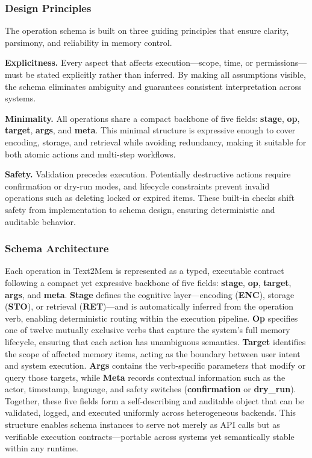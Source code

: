 \documentclass[conference]{IEEEtran}
\begin{document}
\subsubsection{\textbf{Design Principles}}

The operation schema is built on three guiding principles that ensure clarity, parsimony, and reliability in memory control.

\textbf{Explicitness.}
Every aspect that affects execution—scope, time, or permissions—must be stated explicitly rather than inferred.  
By making all assumptions visible, the schema eliminates ambiguity and guarantees consistent interpretation across systems.

\textbf{Minimality.}
All operations share a compact backbone of five fields: \textbf{stage}, \textbf{op}, \textbf{target}, \textbf{args}, and \textbf{meta}.  
This minimal structure is expressive enough to cover encoding, storage, and retrieval while avoiding redundancy, making it suitable for both atomic actions and multi-step workflows.

\textbf{Safety.}
Validation precedes execution.  
Potentially destructive actions require confirmation or dry-run modes, and lifecycle constraints prevent invalid operations such as deleting locked or expired items.  
These built-in checks shift safety from implementation to schema design, ensuring deterministic and auditable behavior.

\subsubsection{\textbf{Schema Architecture}}

Each operation in Text2Mem is represented as a typed, executable contract following a compact yet expressive backbone of five fields: \textbf{stage}, \textbf{op}, \textbf{target}, \textbf{args}, and \textbf{meta}.  
\textbf{Stage} defines the cognitive layer—encoding (\textbf{ENC}), storage (\textbf{STO}), or retrieval (\textbf{RET})—and is automatically inferred from the operation verb, enabling deterministic routing within the execution pipeline.  
\textbf{Op} specifies one of twelve mutually exclusive verbs that capture the system’s full memory lifecycle, ensuring that each action has unambiguous semantics.  
\textbf{Target} identifies the scope of affected memory items, acting as the boundary between user intent and system execution.  
\textbf{Args} contains the verb-specific parameters that modify or query those targets, while \textbf{Meta} records contextual information such as the actor, timestamp, language, and safety switches (\textbf{confirmation} or \textbf{dry\_run}).  
Together, these five fields form a self-describing and auditable object that can be validated, logged, and executed uniformly across heterogeneous backends.  
This structure enables schema instances to serve not merely as API calls but as verifiable execution contracts—portable across systems yet semantically stable within any runtime.
\end{document}

